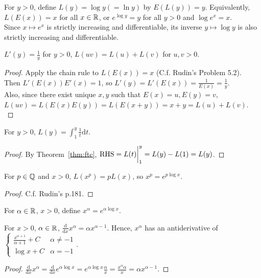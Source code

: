 \begin{define}
	For $y>0$, define $L(y)=\log{y}(= \ln{y})$ by $E(L(y))=y$.
	Equivalently, $L(E(x))=x$ for all $x \in \mathbb{R}$, or
	$e^{\log{y}}=y$ for all $y>0$ and $\log{e^{x}}=x$.\\
	Since $x \mapsto e^{x}$ is strictly increasing and differentiable,
	its inverse $y \mapsto \log{y}$ is also strictly increasing and differentiable.\\
\end{define}
\begin{thm*}
	$L'(y)=\frac{1}{y}$ for $y>0$, $L(uv)=L(u)+L(v)$ for $u,v>0$.
	\begin{proof}
		Apply the chain rule to $L(E(x))=x$ (C.f. Rudin's Problem 5.2).\\
		Then $L'(E(x))E'(x)=1$, so $L'(y)=L'(E(x))=\frac{1}{E(x)}=\frac{1}{y}$.\\
		Also, since there exist unique $x,y$ such that $E(x)=u,E(y)=v$, $L(uv)=L(E(x)E(y))=L(E(x+y))=x+y=L(u)+L(v)$.\\
	\end{proof}
\end{thm*}
\begin{corollary*}
	For $y>0$, $L(y)= \int_{1}^{y}{\frac{1}{t}\mathrm{d}t}$.
	\begin{proof}
		By Theorem~\ref{thm:ftc},
		$\text{RHS} = L(t)\bigg{\rvert}_{1}^{y}=L(y)-L(1)=L(y)$.
	\end{proof}
\end{corollary*}

\begin{thm*}
	For $p \in \mathbb{Q}$ and $x>0$, $L(x^{p})=pL(x)$, so $x^{p}=e^{p \log{x}}$.
	\begin{proof}
		C.f. Rudin's p.181.
	\end{proof}
\end{thm*}

\begin{define}
	For $\alpha \in \mathbb{R}$, $x>0$, define $x^{\alpha}=e^{\alpha \log{x}}$.
\end{define}
\begin{thm}
	For $x>0$, $\alpha \in \mathbb{R}$, $\frac{\mathrm{d}}{\mathrm{d}x} x^{\alpha}=\alpha x^{\alpha-1}$.
	Hence, $x^{\alpha}$ has an antiderivative of $\begin{cases}
			\frac{x^{\alpha+1}}{\alpha+1}+C & \alpha \neq -1 \\
			\log{x}+C                       & \alpha=-1
		\end{cases}$.
	\begin{proof}
		$\frac{\mathrm{d}}{\mathrm{d}x}x^{\alpha}=\frac{\mathrm{d}}{\mathrm{d}x}e^{\alpha \log{x}}=e^{\alpha \log{x}}\frac{\alpha}{x}=\frac{x^{\alpha}\alpha}{x}=\alpha x^{\alpha-1}$.
	\end{proof}
\end{thm}

